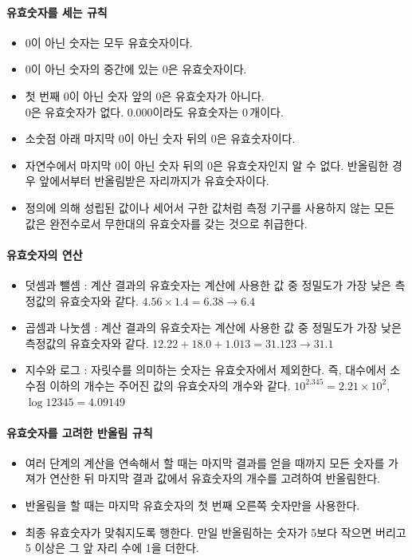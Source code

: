 \documentclass{GSHS-chemexp}
\begin{document}
	\paragraph{유효숫자를 세는 규칙}
	\begin{itemize}
		\item 0이 아닌 숫자는 모두 유효숫자이다.
		\item 0이 아닌 숫자의 중간에 있는 0은 유효숫자이다.
		\item 첫 번째 0이 아닌 숫자 앞의 0은 유효숫자가 아니다.\\
		0은 유효숫자가 없다. 0.000이라도 유효숫자는 $0\,\mbox{개}$이다.
		\item 소숫점 아래 마지막 0이 아닌 숫자 뒤의 0은 유효숫자이다.
		\item 자연수에서 마지막 0이 아닌 숫자 뒤의 0은 유효숫자인지
		알 수 없다. 반올림한 경우 앞에서부터 반올림받은 자리까지가
		유효숫자이다.
		\item 정의에 의해 성립된 값이나 세어서 구한 값처럼
		측정 기구를 사용하지 않는 모든 값은 완전수로서
		무한대의 유효숫자를 갖는 것으로 취급한다.
	\end{itemize}
	
	\paragraph{유효숫자의 연산}
	\begin{itemize}
		\item 덧셈과 뺄셈 : 계산 결과의 유효숫자는
		계산에 사용한 값 중 정밀도가 가장 낮은 측정값의
		유효숫자와 같다.
		$4.56 \times 1.4 = 6.38 \rightarrow 6.4$
		\item 곱셈과 나눗셈 : 계산 결과의 유효숫자는
		계산에 사용한 값 중 정밀도가 가장 낮은 측정값의
		유효숫자와 같다.
		$12.22+18.0+1.013=31.123 \rightarrow 31.1$
		\item 지수와 로그 : 자릿수를 의미하는 숫자는
		유효숫자에서 제외한다. 즉, 대수에서 소수점 이하의 개수는
		주어진 값의 유효숫자의 개수와 같다.
		$10^{2.345} = 2.21 \times 10^{2}$,
		$\log 12345 = 4.09149$
	\end{itemize}
	
	\paragraph{유효숫자를 고려한 반올림 규칙}
	\begin{itemize}
		\item 여러 단계의 계산을 연속해서 할 때는
		마지막 결과를 얻을 때까지 모든 숫자를 가져가 연산한 뒤
		마지막 결과 값에서 유효숫자의 개수를 고려하여 반올림한다.
		\item 반올림을 할 때는 마지막 유효숫자의
		첫 번째 오른쪽 숫자만을 사용한다.
		\item 최종 유효숫자가 맞춰지도록 행한다.
		만일 반올림하는 숫자가 5보다 작으면 버리고
		5 이상은 그 앞 자리 수에 1을 더한다.
	\end{itemize}
	
\end{document}

